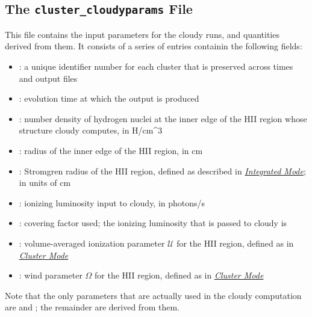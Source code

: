 \documentclass[letterpaper,10pt,english]{sphinxmanual}
\begin{document}
\subsection{The \texttt{cluster\_cloudyparams} File}
\label{cloudy:the-cluster-cloudyparams-file}
This file contains the input parameters for the cloudy runs, and
quantities derived from them. It consists of a series of entries
containin the following fields:
\begin{itemize}
\item {} 
: a unique identifier number for each cluster that is
preserved across times and output files

\item {} 
: evolution time at which the output is produced

\item {} 
: number density of hydrogen nuclei at the inner edge of the
HII region whose structure cloudy computes, in H/cm\textasciicircum{}3

\item {} 
: radius of the inner edge of the HII region, in cm

\item {} 
: Stromgren radius of the HII region, defined as described in
{\hyperref[cloudy:sssec\string-cloudy\string-integrated\string-mode]{\emph{Integrated Mode}}}; in units of cm

\item {} 
: ionizing luminosity input to cloudy, in photons/s

\item {} 
: covering factor used; the ionizing luminosity that is
passed to cloudy is 

\item {} 
: volume-averaged ionization parameter \(\mathcal{U}\) for
the HII region, defined as in {\hyperref[cloudy:sssec\string-cloudy\string-cluster\string-mode]{\emph{Cluster Mode}}}

\item {} 
: wind parameter \(\Omega\) for the HII region, defined
as in {\hyperref[cloudy:sssec\string-cloudy\string-cluster\string-mode]{\emph{Cluster Mode}}}

\end{itemize}

Note that the only parameters that are actually used in the cloudy
computation are  and ; the remainder are derived
from them.
\end{document}
